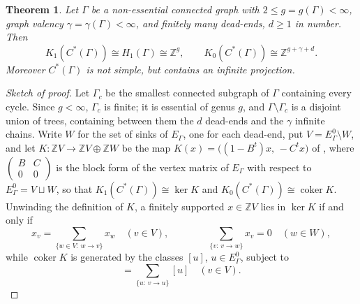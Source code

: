 \documentclass[12pt,reqno]{amsart}
\theoremstyle{plain}
\newtheorem{theorem}{Theorem}[section]
\theoremstyle{definition}
\newcommand{\Z}{\mathbb{Z}}
\newcommand{\coker}{\operatorname{coker}}
\begin{document}
\begin{theorem}\label{thm:nonessential-K}
Let $\Gamma$ be a non-essential connected graph with $2\le g=g(\Gamma)<\infty$, graph valency
$\gamma=\gamma(\Gamma)<\infty$, and finitely many dead-ends, $d\ge 1$ in number. Then
\[
K_1(C^*(\Gamma))\cong H_1(\Gamma)\cong\Z^{g},\qquad K_0(C^*(\Gamma))\cong\Z^{g+\gamma+d}.
\]
Moreover $C^*(\Gamma)$ is not simple, but contains an infinite projection.
\end{theorem}

\begin{proof}[Sketch of proof]
Let $\Gamma_c$ be the smallest connected subgraph of $\Gamma$ containing every cycle. Since
$g<\infty$, $\Gamma_c$ is finite; it is essential of genus $g$, and $\Gamma\setminus\Gamma_c$ is a
disjoint union of trees, containing between them the $d$ dead-ends and the $\gamma$ infinite
chains. Write $W$ for the set of sinks of $E_\Gamma$, one for each dead-end, put
$V=E_\Gamma^0\setminus W$, and let $K\colon\Z V\to\Z V\oplus\Z W$ be the map
$K(x)=\big((1-B^{t})x,\,-C^{t}x\big)$ of \cite[Theorem~3.2]{RS}, where
$\left(\begin{smallmatrix} B & C\\ 0 & 0\end{smallmatrix}\right)$ is the block form of the vertex
matrix of $E_\Gamma$ with respect to $E_\Gamma^0=V\sqcup W$, so that
$K_1(C^*(\Gamma))\cong\ker K$ and $K_0(C^*(\Gamma))\cong\coker K$. Unwinding the definition of $K$, a
finitely supported $x\in\Z V$ lies in $\ker K$ if and only if
\begin{equation}
x_v=\sum_{\{w\in V:\,w\to v\}}x_w\quad(v\in V),\qquad\qquad
\sum_{\{v:\,v\to w\}}x_v=0\quad(w\in W),\tag{$*$}
\end{equation}
while $\coker K$ is generated by the classes $[u]$, $u\in E_\Gamma^0$, subject to
\begin{equation}
[v]=\sum_{\{u:\,v\to u\}}[u]\quad(v\in V).\tag{$**$}
\end{equation}


\end{proof}
\end{document}
